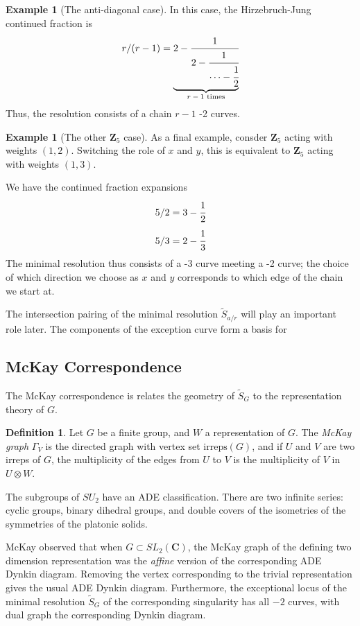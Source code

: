 \documentclass{amsart}[12pt]
\theoremstyle{definition}
\newtheorem{example}[dummy]{Example}
\newtheorem{definition}[dummy]{Definition}
\newcommand{\Z}{\mathbf{Z}}
\newcommand{\C}{\mathbf{C}}
\newcommand{\irreps}{\text{irreps}}
\begin{document}
\begin{example}[The anti-diagonal case]  
In this case, the Hirzebruch-Jung continued fraction is
$$r/(r-1)=\underbrace{2-\cfrac{1}{2-\cfrac{1}{\cdots-\cfrac{1}{2}}}}_{\text{$r-1$ times}}$$
Thus, the resolution consists of a chain $r-1$ -2 curves.
\end{example}

\begin{example}[The other $\Z_5$ case]
As a final example, consder $\Z_5$ acting with weights $(1,2)$.  Switching the role of $x$ and $y$, this is equivalent to $\Z_5$ acting with weights $(1,3)$.

We have the continued fraction expansions
$$5/2=3-\cfrac{1}{2}$$
$$5/3=2-\cfrac{1}{3}$$
The minimal resolution thus consists of a -3 curve meeting a -2 curve; the choice of which direction we choose as $x$ and $y$ corresponds to which edge of the chain we start at.
\end{example}

The intersection pairing of the minimal resolution $\widetilde{S}_{a/r}$ will play an important role later.  The components of the exception curve form a basis for 


\subsection{McKay Correspondence}
The McKay correspondence is relates the geometry of $\widetilde{S}_G$ to the representation theory of $G$.

\begin{definition}
Let $G$ be a finite group, and $W$ a representation of $G$.  The \emph{McKay graph} $\Gamma_V$ is the directed graph with vertex set $\irreps(G)$, and if $U$ and $V$ are two irreps of $G$, the multiplicity of the edges from $U$ to $V$ is the multiplicity of $V$ in $U\otimes W$.
\end{definition}

The subgroups of $SU_2$ have an ADE classification.  There are two infinite series: cyclic groups, binary dihedral groups, and double covers of the isometries of the symmetries of the platonic solids.

McKay observed that when $G\subset SL_2(\C)$, the McKay graph of the defining two dimension representation was the \emph{affine} version of the corresponding ADE Dynkin diagram.  Removing the vertex corresponding to the trivial representation gives the usual ADE Dynkin diagram.  Furthermore, the exceptional locus of the minimal resolution $\widetilde{S}_G$ of the corresponding singularity has all $-2$ curves, with dual graph the corresponding Dynkin diagram. 
\end{document}
